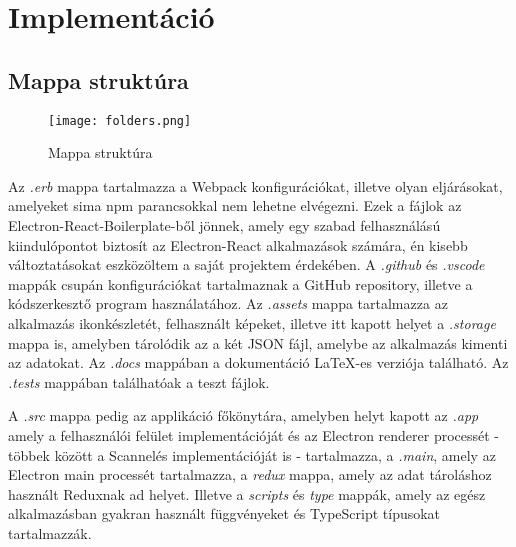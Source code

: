 \section{Implementáció}

\subsection{Mappa struktúra}
\begin{figure}[H]
	\centering
	\texttt{[image: folders.png]}
	\caption{Mappa struktúra}
	\label{fig:folders}
\end{figure}
Az {\it .erb} mappa tartalmazza a Webpack konfigurációkat, illetve olyan eljárásokat, amelyeket sima npm parancsokkal nem lehetne elvégezni. Ezek a fájlok az Electron-React-Boilerplate-ből jönnek, amely egy szabad felhasználású kiindulópontot biztosít az Electron-React alkalmazások számára, én kisebb változtatásokat eszközöltem a saját projektem érdekében.
A {\it .github} és {\it .vscode} mappák csupán konfigurációkat tartalmaznak a GitHub repository, illetve a kódszerkesztő program használatához.
Az {\it .assets} mappa tartalmazza az alkalmazás ikonkészletét, felhasznált képeket, illetve itt kapott helyet a {\it .storage} mappa is, amelyben tárolódik az a két JSON fájl, amelybe az alkalmazás kimenti az adatokat.
Az {\it .docs} mappában a dokumentáció LaTeX-es verziója található.
Az {\it .tests} mappában találhatóak a teszt fájlok.

A {\it .src} mappa pedig az applikáció főkönytára, amelyben helyt kapott az {\it .app} amely a felhasználói felület implementációját és az Electron renderer processét - többek között a Scannelés implementációját is -  tartalmazza, a {\it .main}, amely az Electron main processét tartalmazza, a {\it redux} mappa, amely az adat tároláshoz használt Reduxnak ad helyet. Illetve a {\it scripts} és {\it type} mappák, amely az egész alkalmazásban gyakran használt függvényeket és TypeScript típusokat tartalmazzák.

